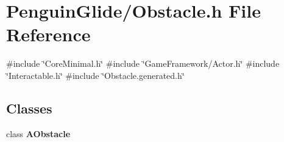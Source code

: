 \section{Penguin\+Glide/\+Obstacle.h File Reference}
\label{_obstacle_8h}
{\ttfamily \#include \char`\"{}Core\+Minimal.\+h\char`\"{}}\newline
{\ttfamily \#include \char`\"{}Game\+Framework/\+Actor.\+h\char`\"{}}\newline
{\ttfamily \#include \char`\"{}Interactable.\+h\char`\"{}}\newline
{\ttfamily \#include \char`\"{}Obstacle.\+generated.\+h\char`\"{}}\newline
\subsection*{Classes}
\begin{DoxyCompactItemize}
\item 
class \textbf{ A\+Obstacle}
\end{DoxyCompactItemize}
